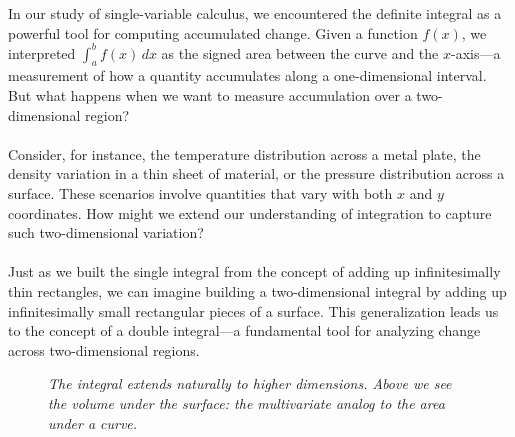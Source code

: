 \newpage 





  

\noindent In our study of single-variable calculus, we encountered the definite integral as a powerful tool for computing accumulated change. Given a function \(f(x)\), we interpreted \(\int_a^b f(x)\,dx\) as the signed area between the curve and the $x$-axis—a measurement of how a quantity accumulates along a one-dimensional interval. But what happens when we want to measure accumulation over a two-dimensional region? \\ \\
Consider, for instance, the temperature distribution across a metal plate, the density variation in a thin sheet of material, or the pressure distribution across a surface. These scenarios involve quantities that vary with both $x$ and $y$ coordinates. How might we extend our understanding of integration to capture such two-dimensional variation? \\ \\
Just as we built the single integral from the concept of adding up infinitesimally thin rectangles, we can imagine building a two-dimensional integral by adding up infinitesimally small rectangular pieces of a surface. This generalization leads us to the concept of a double integral—a fundamental tool for analyzing change across two-dimensional regions.

\begin{figure}[H]
\centering
{}
\caption{\textit{The integral extends naturally to higher dimensions. Above we see the volume under the surface: the multivariate analog to the area under a curve.}}
\end{figure}


